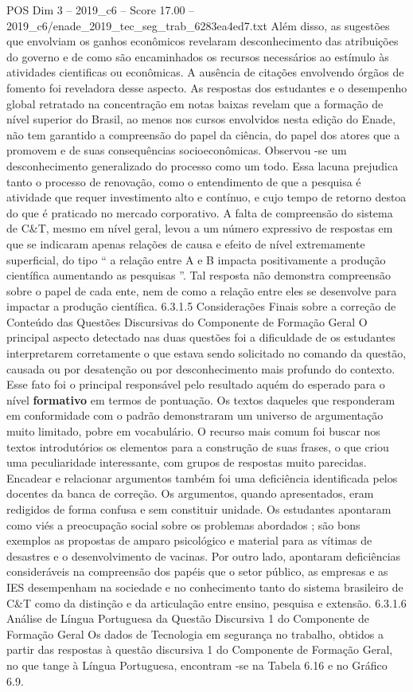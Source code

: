 \begin{textsample}{POS Dim 3 – 2019\_c6 – Score 17.00 – 2019\_c6/enade\_2019\_tec\_seg\_trab\_6283ea4ed7.txt}
Além disso, as sugestões que envolviam os ganhos econômicos revelaram desconhecimento das atribuições do governo e de como são encaminhados os recursos necessários ao estímulo às atividades cientificas ou econômicas.
A ausência de citações envolvendo órgãos de fomento foi reveladora desse aspecto.
As respostas dos estudantes e o desempenho global retratado na concentração em notas baixas revelam que a formação de nível superior do Brasil, ao menos nos cursos envolvidos nesta edição do Enade, não tem garantido a compreensão do papel da ciência, do papel dos atores que a promovem e de suas consequências socioeconômicas.
Observou -se um desconhecimento generalizado do processo como um todo.
Essa lacuna prejudica tanto o processo de renovação, como o entendimento de que a pesquisa é atividade que requer investimento alto e contínuo, e cujo tempo de retorno destoa do que é praticado no mercado corporativo.
A falta de compreensão do sistema de C\&T, mesmo em nível geral, levou a um número expressivo de respostas em que se indicaram apenas relações de causa e efeito de nível extremamente superficial, do tipo “ a relação entre A e B impacta positivamente a produção científica aumentando as pesquisas ”.
Tal resposta não demonstra compreensão sobre o papel de cada ente, nem de como a relação entre eles se desenvolve para impactar a produção científica. 6.3.1.5 Considerações Finais sobre a correção de Conteúdo das Questões Discursivas do Componente de Formação Geral O principal aspecto detectado nas duas questões foi a dificuldade de os estudantes interpretarem corretamente o que estava sendo solicitado no comando da questão, causada ou por desatenção ou por desconhecimento mais profundo do contexto.
Esse fato foi o principal responsável pelo resultado aquém do esperado para o nível \textbf{formativo} em termos de pontuação.
Os textos daqueles que responderam em conformidade com o padrão demonstraram um universo de argumentação muito limitado, pobre em vocabulário.
O recurso mais comum foi buscar nos textos introdutórios os elementos para a construção de suas frases, o que criou uma peculiaridade interessante, com grupos de respostas muito parecidas.
Encadear e relacionar argumentos também foi uma deficiência identificada pelos docentes da banca de correção.
Os argumentos, quando apresentados, eram redigidos de forma confusa e sem constituir unidade.
Os estudantes apontaram como viés a preocupação social sobre os problemas abordados ; são bons exemplos as propostas de amparo psicológico e material para as vítimas de desastres e o desenvolvimento de vacinas.
Por outro lado, apontaram deficiências consideráveis na compreensão dos papéis que o setor público, as empresas e as IES desempenham na sociedade e no conhecimento tanto do sistema brasileiro de C\&T como da distinção e da articulação entre ensino, pesquisa e extensão. 6.3.1.6 Análise de Língua Portuguesa da Questão Discursiva 1 do Componente de Formação Geral Os dados de Tecnologia em segurança no trabalho, obtidos a partir das respostas à questão discursiva 1 do Componente de Formação Geral, no que tange à Língua Portuguesa, encontram -se na Tabela 6.16 e no Gráfico 6.9.

\end{textsample}

